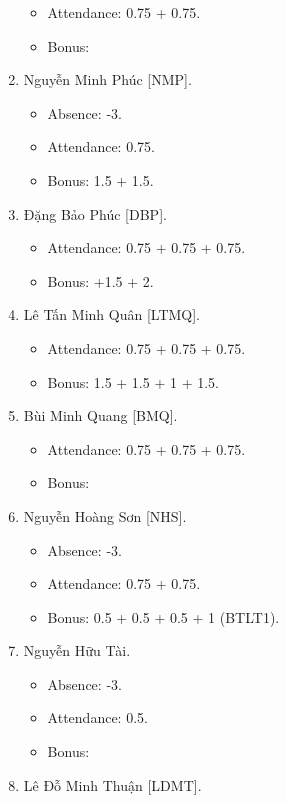 \documentclass{article}
\begin{document}
\begin{enumerate}
\begin{itemize}
        \item Attendance: 0.75 + 0.75.
        \item Bonus:
    \end{itemize}
    \item {\sc Nguyễn Minh Phúc [NMP].}
    \begin{itemize}
        \item Absence: -3.
        \item Attendance: 0.75.
        \item Bonus: 1.5 + 1.5.
    \end{itemize}
    \item {\sc Đặng Bảo Phúc [DBP].}
    \begin{itemize}
        \item Attendance: 0.75 + 0.75 + 0.75.
        \item Bonus: +1.5 + 2.
    \end{itemize}
    \item {\sc Lê Tấn Minh Quân [LTMQ].}
    \begin{itemize}
        \item Attendance: 0.75 + 0.75 + 0.75.
        \item Bonus: 1.5 + 1.5 + 1 + 1.5.
    \end{itemize}
    \item {\sc Bùi Minh Quang [BMQ].}
    \begin{itemize}
        \item Attendance: 0.75 + 0.75 + 0.75.
        \item Bonus:
    \end{itemize}
    \item {\sc Nguyễn Hoàng Sơn [NHS].}
    \begin{itemize}
        \item Absence: -3.
        \item Attendance: 0.75 + 0.75.
        \item Bonus: 0.5 + 0.5 + 0.5 + 1 (BTLT1).
    \end{itemize}
    \item {\sc Nguyễn Hữu Tài.}
    \begin{itemize}
        \item Absence: -3.
        \item Attendance: 0.5.
        \item Bonus:
    \end{itemize}
    \item {\sc Lê Đỗ Minh Thuận [LDMT].}
    \begin{itemize}

\end{itemize}
\end{enumerate}
\end{document}

